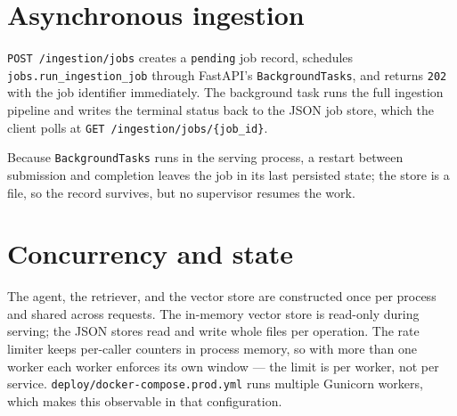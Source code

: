 \section{Asynchronous ingestion}

\texttt{POST /ingestion/jobs} creates a \texttt{pending} job record, schedules
\texttt{jobs.run\_ingestion\_job} through FastAPI's \texttt{BackgroundTasks},
and returns \texttt{202} with the job identifier immediately. The background
task runs the full ingestion pipeline and writes the terminal status back to
the JSON job store, which the client polls at
\texttt{GET /ingestion/jobs/\{job\_id\}}.

Because \texttt{BackgroundTasks} runs in the serving process, a restart between
submission and completion leaves the job in its last persisted state; the store
is a file, so the record survives, but no supervisor resumes the work.

\section{Concurrency and state}

The agent, the retriever, and the vector store are constructed once per process
and shared across requests. The in-memory vector store is read-only during
serving; the JSON stores read and write whole files per operation. The rate
limiter keeps per-caller counters in process memory, so with more than one
worker each worker enforces its own window --- the limit is per worker, not per
service. \texttt{deploy/docker-compose.prod.yml} runs multiple Gunicorn
workers, which makes this observable in that configuration.
